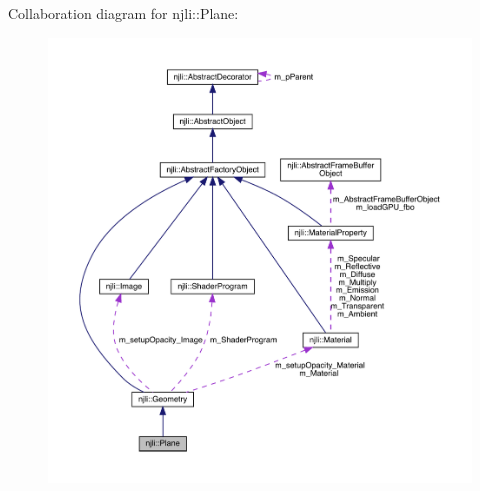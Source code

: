 Collaboration diagram for njli\+:\+:Plane\+:\nopagebreak
\begin{figure}[H]
\begin{center}
\leavevmode
\includegraphics[width=350pt]{classnjli_1_1_plane__coll__graph}
\end{center}
\end{figure}
